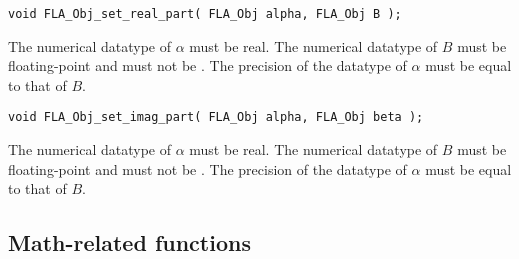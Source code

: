 \begin{flaspec}
\begin{verbatim}
void FLA_Obj_set_real_part( FLA_Obj alpha, FLA_Obj B );
\end{verbatim}
\begin{checks}
\checkitem
The numerical datatype of $ \alpha $ must be real.
\itemvsp
\checkitem
The numerical datatype of $ B $ must be floating-point and must not be
\flaconstantns.
\itemvsp
\checkitem
The precision of the datatype of $ \alpha $ must be equal to that of $ B $.
\end{checks}
\begin{params}
\end{params}
\end{flaspec}


\begin{flaspec}
\begin{verbatim}
void FLA_Obj_set_imag_part( FLA_Obj alpha, FLA_Obj beta );
\end{verbatim}
\begin{checks}
\checkitem
The numerical datatype of $ \alpha $ must be real.
\itemvsp
\checkitem
The numerical datatype of $ B $ must be floating-point and must not be
\flaconstantns.
\itemvsp
\checkitem
The precision of the datatype of $ \alpha $ must be equal to that of $ B $.
\end{checks}
\begin{params}
\end{params}
\end{flaspec}





\subsection{Math-related functions}





